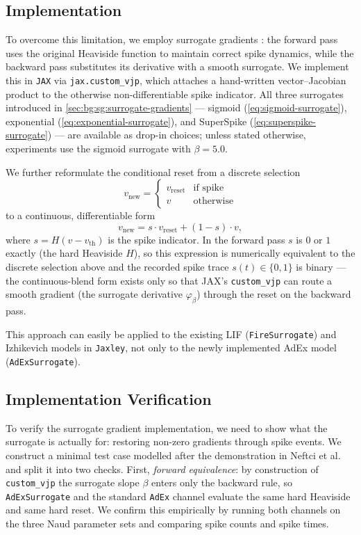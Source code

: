 \subsection{Implementation}\label{sec:method:surrogate-gradients:implementation}
To overcome this limitation, we employ surrogate gradients \cite{Neftci2019}: the forward pass uses the original Heaviside function to maintain correct spike dynamics, while the backward pass substitutes its derivative with a smooth surrogate.
We implement this in \texttt{JAX} via \texttt{jax.custom\_vjp}, which attaches a hand-written vector--Jacobian product to the otherwise non-differentiable spike indicator.
All three surrogates introduced in \cref{sec:bg:sg:surrogate-gradients} --- sigmoid (\cref{eq:sigmoid-surrogate}), exponential (\cref{eq:exponential-surrogate}), and SuperSpike (\cref{eq:superspike-surrogate}) --- are available as drop-in choices; unless stated otherwise, experiments use the sigmoid surrogate with $\beta = 5.0$.

We further reformulate the conditional reset from a discrete selection
\begin{equation}
    v_{\text{new}} = \begin{cases} v_{\text{reset}} & \text{if spike} \\ v & \text{otherwise} \end{cases}
\end{equation}
to a continuous, differentiable form
\begin{equation}
    v_{\text{new}} = s \cdot v_{\text{reset}} + (1 - s) \cdot v,
\end{equation}
where $s = H(v - v_{\text{th}})$ is the spike indicator.
In the forward pass $s$ is $0$ or $1$ exactly (the hard Heaviside $H$), so this expression is numerically equivalent to the discrete selection above and the recorded spike trace $s(t)\in\{0,1\}$ is binary --- the continuous-blend form exists only so that JAX's \texttt{custom\_vjp} can route a smooth gradient (the surrogate derivative $\varphi_\beta$) through the reset on the backward pass.

This approach can easily be applied to the existing \gls{LIF} (\texttt{Fire\-Surrogate}) and Izhikevich models in \texttt{Jax\-ley},
not only to the newly implemented \gls{AdEx} model (\texttt{AdEx\-Surro\-gate}).

\subsection{Implementation Verification}\label{sec:method:surrogate-gradients:verification}
To verify the surrogate gradient implementation, we need to show what the surrogate is actually for: restoring non-zero gradients through spike events.
We construct a minimal test case modelled after the demonstration in Neftci et al.~\cite{Neftci2019} and split it into two checks.
First, \emph{forward equivalence}: by construction of \texttt{custom\_vjp} the surrogate slope $\beta$ enters only the backward rule, so \texttt{AdExSurrogate} and the standard \texttt{AdEx} channel evaluate the same hard Heaviside and same hard reset.
We confirm this empirically by running both channels on the three Naud parameter sets and comparing spike counts and spike times.

